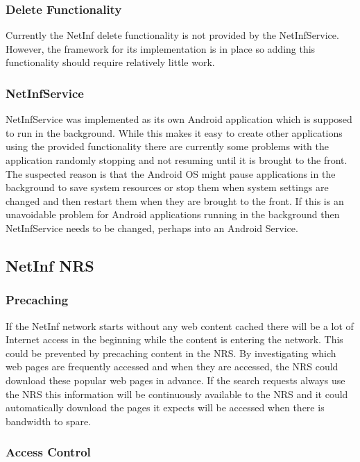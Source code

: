 \subsubsection{Delete Functionality}

Currently the NetInf delete functionality is not provided by the NetInfService. However, the framework for its implementation is in place so adding this functionality should require relatively little work.

\subsubsection{NetInfService}

NetInfService was implemented as its own Android application which is supposed to run in the background. While this makes it easy to create other applications using the provided functionality there are currently some problems with the application randomly stopping and not resuming until it is brought to the front. The suspected reason is that the Android OS might pause applications in the background to save system resources or stop them when system settings are changed and then restart them when they are brought to the front. If this is an unavoidable problem for Android applications running in the background then NetInfService needs to be changed, perhaps into an Android Service.

\subsection{NetInf NRS}

\subsubsection{Precaching}

If the NetInf network starts without any web content cached there will be a lot of Internet access in the beginning while the content is entering the network. This could be prevented by precaching content in the NRS. By investigating which web pages are frequently accessed and when they are accessed, the NRS could download these popular web pages in advance. If the search requests always use the NRS this information will be continuously available to the NRS and it could automatically download the pages it expects will be accessed when there is bandwidth to spare.

\subsubsection{Access Control}

